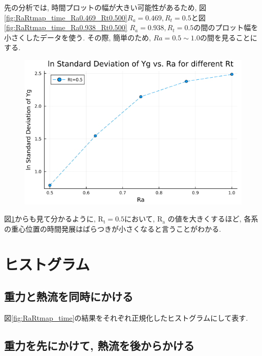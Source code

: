 先の分析では, 時間プロットの幅が大きい可能性があるため, 図\ref{fig:RaRtmap_time_Ra0.469_Rt0.500}$R_a = 0.469, R_t = 0.5$と図\ref{fig:RaRtmap_time_Ra0.938_Rt0.500} $R_a = 0.938, R_t = 0.5$の間のプロット幅を小さくしたデータを使う. その際, 簡単のため, $Ra =0.5 \sim 1.0$の間を見ることにする.



\begin{figure}[H]
  \centering
  \includegraphics[scale=0.5]{image/lnStdYg_Ra0.5to1.0_Rt0.5_ti25000.png}
  \caption{}
  \label{fig:lnStdYg_Ra0.5to1.0_Rt0.5_ti25000}
\end{figure}

図\ref{fig:lnStdYg_Ra0.5to1.0_Rt0.5_ti25000}からも見て分かるように, $\text{R}_\text{t} = 0.5$において, $\text{R}_\text{a}$ の値を大きくするほど, 各系の重心位置の時間発展はばらつきが小さくなると言うことがわかる.


\section{ヒストグラム}

\subsection{重力と熱流を同時にかける}

図\ref{fig:RaRtmap_time}の結果をそれぞれ正規化したヒストグラムにして表す.



\subsection{重力を先にかけて, 熱流を後からかける}

